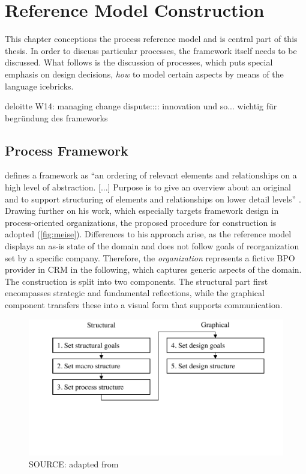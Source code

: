 
\chapter{Reference Model Construction}

This chapter conceptions the process reference model and is central part of this thesis. In order to discuss particular processes, the framework itself needs to be discussed. What follows is the discussion of processes, which puts special emphasis on design decisions, \viz \textit{how} to model certain aspects by means of the language icebricks. 

	deloitte W14: managing change dispute:::: innovation und so... wichtig für begründung des frameworks
	\section{Process Framework}
	
	\citeauthor{Meise2001} defines a framework as \enquote{an ordering of relevant elements and relationships on a high level of abstraction. [...] Purpose is to give an overview about an original and to support structuring of elements and relationships on lower detail levels} \citep[]{Meise2001}. Drawing further on his work, which especially targets framework design in process-oriented organizations, the proposed procedure for construction is adopted (\Fig \ref{fig:meise}). Differences to his approach arise, as the reference model displays an as-is state of the domain and does not follow goals of reorganization set by a specific company. Therefore, the \textit{organization} represents a fictive BPO provider in CRM in the following, which captures generic aspects of the domain. The construction is split into two components. The structural part first encompasses strategic and fundamental reflections, while the graphical component transfers these into a visual form that supports communication.

	\begin{figure}[caption={Procedure for framework construction}, label={fig:meise}]
		{	\includegraphics[width=.8\textwidth]{figures/framework-meise.pdf}}
		\hspace{6.2cm}	SOURCE:  adapted from \citep[]{Meise2001}
	\end{figure} 
	
